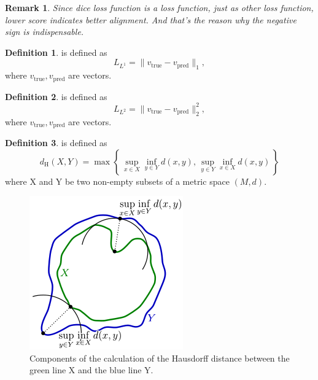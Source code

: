 \documentclass[a4paper]{article}
\theoremstyle{definition}
\newtheorem{definition}{Definition}
\theoremstyle{plain}
\newtheorem{remark}{Remark}
\begin{document}
\begin{remark}
Since dice loss function is a loss function, just as other loss function, lower score indicates better alignment. And that's the reason why the negative sign is indispensable.
\end{remark}

\begin{definition}
 is defined as 
\begin{equation*}
    L_{L^1}=\|v_{\operatorname{true}}-v_{\operatorname{pred}}\|_1,
\end{equation*}
where $v_{\operatorname{true}},v_{\operatorname{pred}}$ are vectors.
\end{definition}

\begin{definition}
 is defined as 
\begin{equation*}
    L_{L^2}=\|v_{\operatorname{true}}-v_{\operatorname{pred}}\|^2_2,
\end{equation*}
where $v_{\operatorname{true}},v_{\operatorname{pred}}$ are vectors.
\end{definition}

\begin{definition}
 is defined as 
\begin{equation*}
     d_{\mathrm {H} }(X,Y)=\max \left\{\,\sup _{x\in X}\inf _{y\in Y}d(x,y),\,\sup _{y\in Y}\inf _{x\in X}d(x,y)\,\right\}
\end{equation*}
where X and Y be two non-empty subsets of a metric space $(M,d)$.
\end{definition}

\begin{figure}[H]
    \centering
    \includegraphics[scale=0.6]{figure/hausdorff.png}
    \caption{Components of the calculation of the Hausdorff distance between the green line X and the blue line Y.}
\end{figure}
\end{document}
